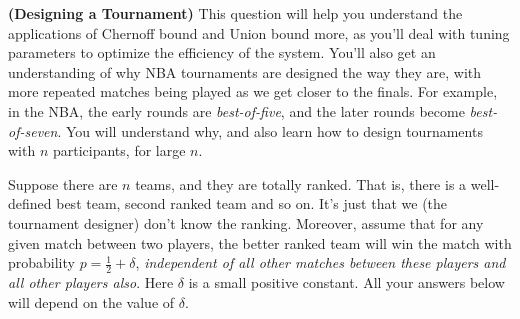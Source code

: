 \documentclass[solution,addpoints,12pt]{exam}
\begin{document}
\begin{questions}


\question[30] \textbf{(Designing a Tournament)}  This question will help you understand the applications of Chernoff bound and Union bound more, as you'll deal with tuning parameters to optimize the efficiency of the system. You'll also get an understanding of why NBA tournaments are designed the way they are, with more repeated matches being played as we get closer to the finals. For example, in the NBA, the early rounds are \emph{best-of-five}, and the later rounds become \emph{best-of-seven}. You will understand why, and also learn how to design tournaments with $n$ participants, for large $n$.

Suppose there are $n$ teams, and they are totally ranked. That is, there is a well-defined best team, second ranked team and so on. It's just that we (the tournament designer) don't know the ranking. Moreover, assume that for any given match between two players, the better ranked team will win the match with probability $p = \frac12 + \delta$, \emph{independent of all other matches between these players and all other players also}. Here $\delta$ is a small positive constant. All your answers below will depend on the value of $\delta$.

\end{questions}
\end{document}
